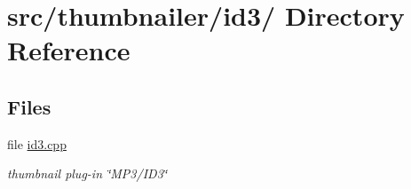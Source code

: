 \hypertarget{dir_000027}{
\section{src/thumbnailer/id3/ Directory Reference}
\label{dir_000027}
}
\subsection*{Files}
\begin{CompactItemize}
\item 
file \hyperlink{id3_8cpp}{id3.cpp}
\begin{CompactList}\small\item\em thumbnail plug-in \char`\"{}MP3/ID3\char`\"{} \item\end{CompactList}

\end{CompactItemize}
